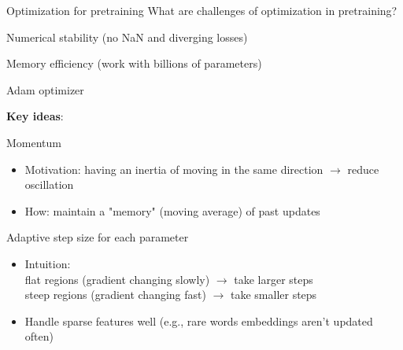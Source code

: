 \documentclass[usenames,dvipsnames,notes,11pt,aspectratio=169,hyperref={colorlinks=true, linkcolor=blue}]{beamer}
\begin{document}
\begin{frame}
    {Optimization for pretraining}
    What are challenges of optimization in pretraining?
    \begin{wideitemize}
        \item Numerical stability (no NaN and diverging losses)\\
        \item Memory efficiency (work with billions of parameters)\\
    \end{wideitemize}
\end{frame}

\begin{frame}
    {Adam optimizer}

    {\bf Key ideas}:\\
    \begin{wideitemize}
        \item Momentum
            \begin{itemize}
                \item Motivation: having an inertia of moving in the same direction $\rightarrow$ reduce oscillation
                \item How: maintain a "memory" (moving average) of past updates
            \end{itemize}
        \pause
        \item Adaptive step size for each parameter
            \begin{itemize}
                \item Intuition:\\
                    flat regions (gradient changing slowly) $\rightarrow$ take larger steps\\
                    steep regions (gradient changing fast) $\rightarrow$ take smaller steps\\
                \item Handle sparse features well (e.g., rare words embeddings aren't updated often)
            \end{itemize}
    \end{wideitemize}
\end{frame}
\end{document}
